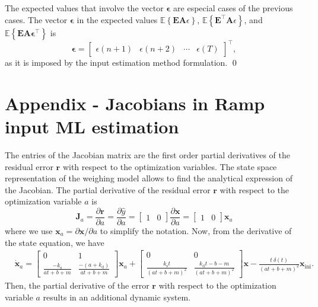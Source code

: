 \begin{pf}
The expected values that involve the vector $\bm{\epsilon}$ are especial cases of the previous cases. 
The vector $\bm{\epsilon}$ in the expected values $\mathbb{E} \left\{ \mathbf{E} \mathbf{A} \epsilon \right\}$, $\mathbb{E} \left\{ \mathbf{E}^\top \mathbf{A} \epsilon \right\}$, and $\mathbb{E} \left\{ \mathbf{E} \mathbf{A} \bm{\epsilon}^\top \right\}$ is
\begin{equation} \bm{\epsilon} = \begin{bmatrix} \epsilon(n+1) & \epsilon(n+2) & \cdots & \epsilon(T) \end{bmatrix}^\top, \end{equation}
as it is imposed by the input estimation method formulation.
\qed \end{pf}

\section{Appendix - Jacobians in Ramp input ML estimation  \label{appendix:Jacobians}}


The entries of the Jacobian matrix are the first order partial derivatives of the residual error $\mathbf{r}$ with respect to the optimization variables.
The state space representation of the weighing model allows to find the analytical expression of the Jacobian.
The partial derivative of the residual error $\mathbf{r}$ with respect to the optimization variable $a$ is 
\begin{equation} \mathbf{J}_a=\dfrac{\partial \mathbf{r}}{\partial a} = \dfrac{\partial \widehat{y}}{\partial a} = \begin{bmatrix} 1 & 0  \end{bmatrix} \dfrac{\partial \mathbf{x}}{\partial a} = \begin{bmatrix} 1 & 0  \end{bmatrix} \mathbf{x}_a \end{equation}
where we use $\mathbf{x}_a = \partial \mathbf{x}/ \partial a$ to simplify the notation. 
Now, from the derivative of the state equation, we have
\begin{equation} \begin{aligned} 
    & \dot{\mathbf{x}}_a = \begin{bmatrix} 0 & 1 \\ \frac{-k_{\mathrm{s}}}{a t + b + m} & \frac{-(a + k_{\mathrm{d}})}{a t + b + m} \end{bmatrix} \mathbf{x}_a 
    + \begin{bmatrix} 0 & 0 \\ \frac{k_{\mathrm{s}} t}{(a t + b + m)^2} & \frac{k_{\mathrm{d}} t - b - m}{(a t + b + m)^2} \end{bmatrix} \mathbf{x} 
    - \frac{t \ \delta(t)}{(a t + b + m)^2} \mathbf{x}_{\text{ini}}   . 
\end{aligned} \end{equation}
Then, the partial derivative of the error $\mathbf{r}$ with respect to the optimization variable $a$ results in an additional dynamic system.

